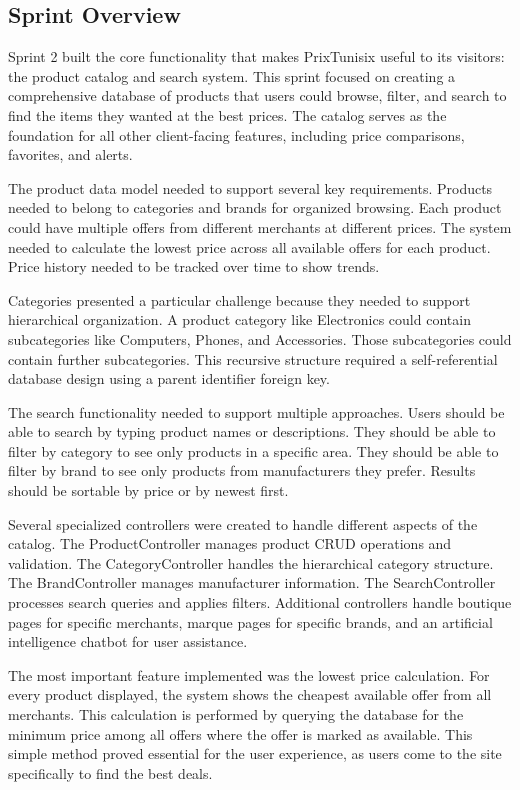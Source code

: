 \subsection*{Sprint Overview}

Sprint 2 built the core functionality that makes PrixTunisix
useful to its visitors: the product catalog and search system.
This sprint focused on creating a comprehensive database of
products that users could browse, filter, and search to find
the items they wanted at the best prices. The catalog serves
as the foundation for all other client-facing features,
including price comparisons, favorites, and alerts.

The product data model needed to support several key requirements.
Products needed to belong to categories and brands for organized
browsing. Each product could have multiple offers from different
merchants at different prices. The system needed to calculate the
lowest price across all available offers for each product.
Price history needed to be tracked over time to show trends.

Categories presented a particular challenge because they needed
to support hierarchical organization. A product category like
Electronics could contain subcategories like Computers, Phones,
and Accessories. Those subcategories could contain further
subcategories. This recursive structure required a self-referential
database design using a parent identifier foreign key.

The search functionality needed to support multiple approaches.
Users should be able to search by typing product names or
descriptions. They should be able to filter by category to see
only products in a specific area. They should be able to filter
by brand to see only products from manufacturers they prefer.
Results should be sortable by price or by newest first.

Several specialized controllers were created to handle different
aspects of the catalog. The ProductController manages product
CRUD operations and validation. The CategoryController handles
the hierarchical category structure. The BrandController manages
manufacturer information. The SearchController processes search
queries and applies filters. Additional controllers handle
boutique pages for specific merchants, marque pages for specific
brands, and an artificial intelligence chatbot for user assistance.

The most important feature implemented was the lowest price
calculation. For every product displayed, the system shows the
cheapest available offer from all merchants. This calculation
is performed by querying the database for the minimum price among
all offers where the offer is marked as available. This simple method
proved essential for the user experience, as users come to the
site specifically to find the best deals.

